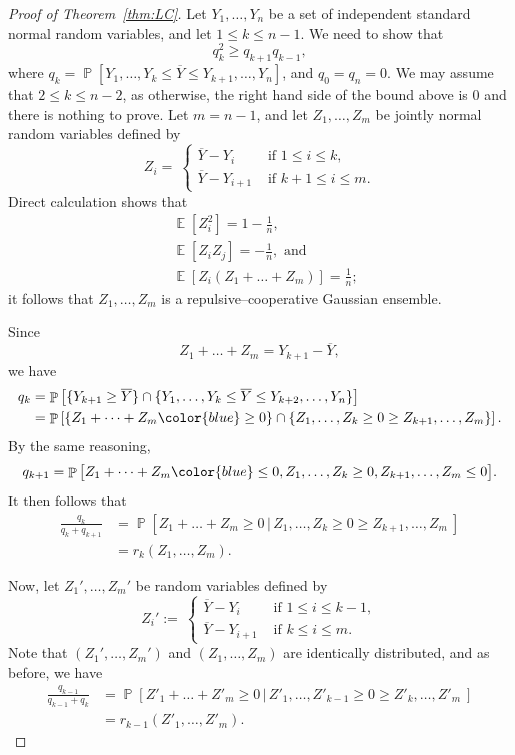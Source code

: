 \documentclass[12pt,english,reqno]{amsart}
\theoremstyle{plain}
\theoremstyle{remark}
\numberwithin{figure}{section}
\numberwithin{equation}{section}
\def\bY{\overline{Y}}
\DeclareMathOperator{\Eb}{\mathbb{E}} %
\DeclareMathOperator{\Pb}{\mathbb{P}} %
\def\aq{q} %
\def\ar{r} %
\begin{document}
\begin{proof}[Proof of Theorem~\ref{thm:LC}]
	Let $Y_1,\dots, Y_n$ be a set of independent standard normal random variables, and let $1 \leq k \leq n-1$. We need to show that
	\[\aq_{k}^2 \geq \aq_{k+1} \aq_{k-1},\]
	where $\aq_k = \Pb[ Y_1,\dots, Y_k \leq \bY \leq Y_{k+1}, \dots, Y_{n}]$, and $q_0 = q_n = 0$. We may assume that $2 \le k \leq n-2$, as otherwise, the right hand side of the bound above is $0$ and there is nothing to prove. Let $m= n-1$, and let $Z_1,\dots, Z_m$ be jointly normal random variables defined by
	\[ Z_i = \
		\begin{cases}
			\bY - Y_i     & \text{ if $1 \leq i\leq k$},    \\
			\bY - Y_{i+1} & \text{ if $k+1 \leq i \leq m$}.
		\end{cases}
	\]
	Direct calculation shows that
	\begin{align*}
		 & \Eb[Z_i^2] = 1 - \frac{1}{n},            \\
		 & \Eb[Z_i Z_j] = -\frac{1}{n}, \text{ and} \\
		 & \Eb[Z_i(Z_1+\dots+Z_m)] = \frac{1}{n};
	\end{align*}
	it follows that $Z_1,\dots, Z_m$ is a repulsive–cooperative Gaussian ensemble.

	Since
	\[ Z_1+\dots + Z_m = Y_{k+1}- \bY,\]
	we have
	\begin{align*}
		\aq_k & = \Pb\left[ \{Y_{k+1} \geq \bY \} \cap \{Y_1,\dots, Y_k \leq \bY \leq Y_{k+2}, \dots, Y_{n} \} \right]                 \\
		      & = \Pb\left[ \{Z_1+\dots +Z_m {\color{blue}\geq 0} \} \cap \{Z_1,\dots, Z_k \geq 0 \geq Z_{k+1}, \dots, Z_m \} \right].
	\end{align*}
	By the same reasoning,
	\[
		\aq_{k+1} = \Pb\big[ Z_1+\dots +Z_m {\color{blue}\leq 0}, Z_1,\dots, Z_k \geq 0, Z_{k+1}, \dots, Z_m \leq 0 \big].
	\]
	It then follows that
	\begin{align*}
		\frac{\aq_k}{\aq_k + \aq_{k+1}} & = \Pb \left[ Z_1+\dots +Z_m \geq 0 \,\vert\, Z_1,\dots, Z_k \geq 0\geq Z_{k+1},\dots, Z_m \ \right] \\
		                                & = \ar_k(Z_1,\dots, Z_m).
	\end{align*}


	Now, let $Z_1',\dots, Z_m'$ be random variables defined by
	\[ Z_i' := \
		\begin{cases}
			\bY - Y_i     & \text{ if $1 \leq i\leq k-1$}, \\
			\bY - Y_{i+1} & \text{ if $k \leq i \leq m$}.
		\end{cases}
	\]
	Note that $(Z_1',\dots, Z_m')$ and $(Z_1,\dots, Z_m)$ are identically distributed, and as before, we have
	\begin{align*}
		\frac{\aq_{k-1}}{\aq_{k-1} + \aq_{k}} & = \Pb \left[ Z'_1+\dots +Z'_m \geq 0 \,\vert\, Z'_1,\dots, Z'_{k-1} \geq 0\geq Z'_k,\dots, Z'_m \ \right] \\
		                                      & = \ar_{k-1}(Z'_1,\dots, Z'_m).
	\end{align*}


\end{proof}
\end{document}
